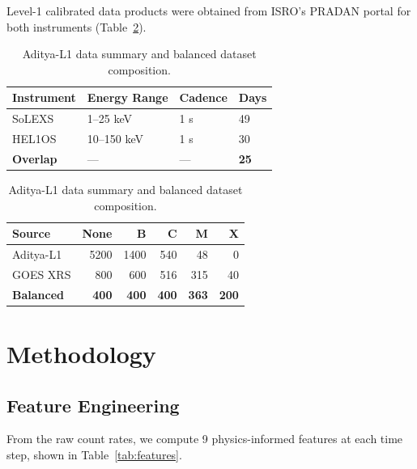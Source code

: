 \documentclass[twocolumn,10pt]{article}
\begin{document}
Level-1 calibrated data products were obtained from ISRO's PRADAN portal for both instruments (Table~\ref{tab:data}).

\begin{table}[htbp]
\centering
\caption{Aditya-L1 data summary and balanced dataset composition.}
\label{tab:data}
\footnotesize
\begin{tabular}{@{}llll@{}}
\toprule
Instrument & Energy Range & Cadence & Days \\
\midrule
SoLEXS & 1--25 keV & 1 s & 49 \\
HEL1OS & 10--150 keV & 1 s & 30 \\
\textbf{Overlap} & --- & --- & \textbf{25} \\
\bottomrule
\end{tabular}

\vspace{6pt}

\begin{tabular}{@{}lrrrrr@{}}
\toprule
Source & None & B & C & M & X \\
\midrule
Aditya-L1 & 5200 & 1400 & 540 & 48 & 0 \\
GOES XRS & 800 & 600 & 516 & 315 & 40 \\
\midrule
\textbf{Balanced} & \textbf{400} & \textbf{400} & \textbf{400} & \textbf{363} & \textbf{200} \\
\bottomrule
\end{tabular}
\end{table}


\section{Methodology}\label{sec:method}

\subsection{Feature Engineering}\label{sec:features}

From the raw count rates, we compute 9 physics-informed features at each time step, shown in Table~\ref{tab:features}.
\end{document}
